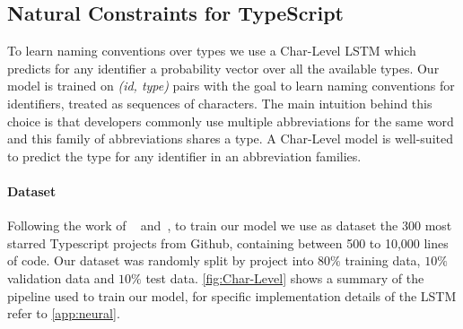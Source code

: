 \documentclass[acmsmall, review, anonymous]{acmart}\settopmatter{printfolios=true,printccs=false,printacmref=false}
\begin{document}


\subsection{Natural Constraints for TypeScript}\label{ssec:natprodts}

To learn naming conventions over types we use a Char-Level LSTM which predicts for any identifier a probability vector over all the available types. Our model is trained on
\textit{(id, type)} pairs with the goal to learn naming conventions
for identifiers, treated as sequences of characters.
The main intuition behind this choice is that
developers commonly use multiple abbreviations for the same word and
this family of abbreviations shares a type.
A Char-Level model is well-suited to predict the type for any identifier in
an abbreviation families.

%
\paragraph{Dataset} Following the work of 
~\citet{wei20} and~\citet{hellendoorn18},
to train our model we use as dataset the 300 
most starred Typescript projects from Github, 
containing between 500 to 10,000 lines of code.
Our dataset was randomly split by project into $80\%$ training data, $10\%$ validation data and $10\%$ test data. \cref{fig:Char-Level} shows a summary of the pipeline used to train our model, for specific implementation details of the LSTM refer to \cref{app:neural}.  
%
\end{document}
